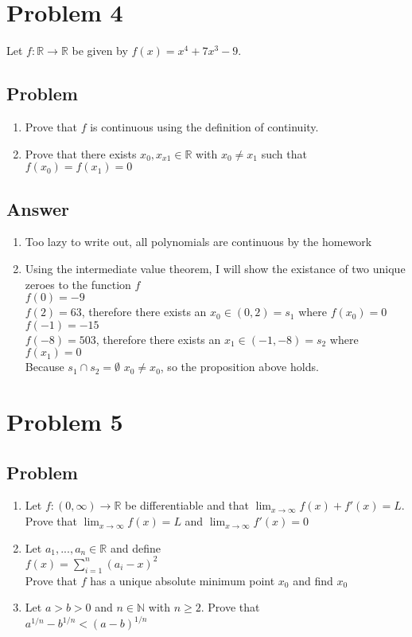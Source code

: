 \documentclass{article}
\newcommand\tab[1][1cm]{\hspace*{#1}}
\begin{document}
\section*{Problem 4}
Let \(f: \mathbb{R} \to \mathbb{R}\) be given by \(f(x) = x^{4} + 7x^{3} - 9\).
\subsection*{Problem}
\begin{enumerate}[label=(\alph*)]
	\item Prove that \(f\) is continuous using the definition of continuity.
	\item Prove that there exists \(x_{0},x_{x1} \in \mathbb{R}\) with \(x_{0} \ne x_{1}\) such that \(f(x_{0}) = f(x_{1}) = 0\)
\end{enumerate}
\subsection*{Answer}
\begin{enumerate}[label=(\alph*)]
	\item
		Too lazy to write out, all polynomials are continuous by the homework
	\item
		Using the intermediate value theorem, I will show the existance of two unique zeroes to the function \(f\) \\
		\(f(0) = -9\) \\ \(f(2) = 63\), therefore there exists an \(x_{0} \in (0,2) = s_{1}\) where \(f(x_{0}) = 0\) \\
		\(f(-1) = -15\) \\ \(f(-8) = 503\), therefore there exists an \(x_{1} \in (-1,-8) = s_{2}\) where \(f(x_{1}) = 0\) \\
		Because \(s_{1} \cap s_{2} = \emptyset\) \(x_{0} \ne x_{0}\), so the proposition above holds.
\end{enumerate}
\section*{Problem 5}
\subsection*{Problem}
\begin{enumerate}[label=(\alph*)]
	\item 	Let \(f : (0, \infty) \to \mathbb{R}\) be differentiable and that \(\lim_{x \to \infty}f(x) + f'(x) = L\). Prove that 
		\(\lim_{x \to \infty}f(x) = L\) and \(\lim_{x \to \infty}f'(x) = 0\)
	\item 	Let \(a_{1}, ..., a_{n} \in \mathbb{R}\) and define \\
	\tab[2cm] \tab[2cm] \(f(x) = \sum\limits_{i=1}^{n}(a_{i} - x)^2\)\\
		Prove that \(f\) has a unique absolute minimum point \(x_{0}\) and find \(x_{0}\) 
	\item 	Let \(a > b > 0\) and \(n \in \mathbb{N}\) with \( n \ge 2\). Prove that \\	
	\tab[2cm] \tab[2cm] \(a^{1/n} - b^{1/n} < (a - b)^{1/n}\)
\end{enumerate}
\end{document}
